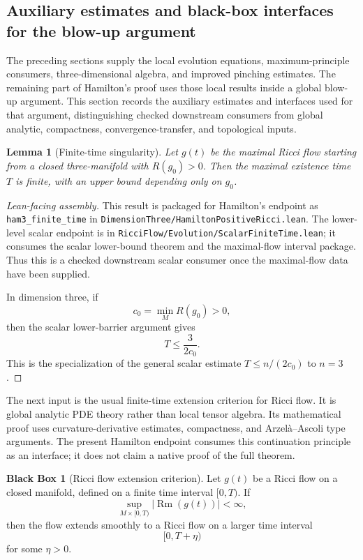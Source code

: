 \documentclass[11pt]{article}
\theoremstyle{plain}
\newtheorem{lemma}[theorem]{Lemma}
\theoremstyle{definition}
\newtheorem{blackbox}[theorem]{Black Box}
\theoremstyle{remark}
\newcommand{\Rm}{\operatorname{Rm}}
\newcommand{\norm}[1]{\left|#1\right|}
\newcommand{\leanref}[1]{\nolinkurl{#1}}
\newcommand{\leanfile}[1]{\nolinkurl{#1}}
\newcommand{\rffile}[1]{\leanfile{#1}}
\begin{document}
\subsection{Auxiliary estimates and black-box interfaces for the blow-up argument}

The preceding sections supply the local evolution equations, maximum-principle
consumers, three-dimensional algebra, and improved pinching estimates.  The
remaining part of Hamilton's proof uses those local results inside a global
blow-up argument.  This section records the auxiliary estimates and interfaces
used for that argument, distinguishing checked downstream consumers from global
analytic, compactness, convergence-transfer, and topological inputs.

\begin{lemma}[Finite-time singularity]
\label{lem:finite-time}
Let $g(t)$ be the maximal Ricci flow starting from a closed three-manifold with
$R(g_0)>0$. Then the maximal existence time $T$ is finite, with an upper bound
depending only on $g_0$.
\end{lemma}

\begin{proof}[Lean-facing assembly]
This result is packaged for Hamilton's endpoint as \leanref{ham3_finite_time}
in \rffile{DimensionThree/HamiltonPositiveRicci.lean}.  The lower-level scalar endpoint is in
\rffile{RicciFlow/Evolution/ScalarFiniteTime.lean}; it consumes the scalar
lower-bound theorem and the maximal-flow interval package.  Thus this is a
checked downstream scalar consumer once the maximal-flow data have been
supplied.

In dimension three, if
\[
  c_0=\min_M R(g_0)>0,
\]
then the scalar lower-barrier argument gives
\[
  T\le \frac{3}{2c_0}.
\]
This is the specialization of the general scalar estimate
\(T\le n/(2c_0)\) to \(n=3\).
\end{proof}

The next input is the usual finite-time extension criterion for Ricci flow.
It is global analytic PDE theory rather than local tensor algebra.  Its
mathematical proof uses curvature-derivative estimates, compactness, and
Arzel\`a--Ascoli type arguments.  The present Hamilton endpoint consumes this
continuation principle as an interface; it does not claim a native proof of the
full theorem.

\begin{blackbox}[Ricci flow extension criterion]
\label{bb:rf-extension-criterion}
Let $g(t)$ be a Ricci flow on a closed manifold, defined on a finite time
interval $[0,T)$. If
\[
\sup_{M\times[0,T)} \norm{\Rm(g(t))}<\infty,
\]
then the flow extends smoothly to a Ricci flow on a larger time interval
\[
[0,T+\eta)
\]
for some $\eta>0$.
\end{blackbox}
\end{document}

